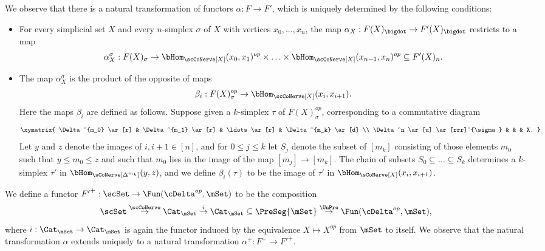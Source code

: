 \begin{notation}
We observe that there is a natural transformation of functors
$\alpha: F \rightarrow F'$, which is uniquely determined by the following conditions:
\begin{itemize}
\item For every simplicial set $X$ and every $n$-simplex $\sigma$ of $X$ with
vertices $x_0, \ldots, x_n$, the map $\alpha_{X}: F(X)_{\bigdot} \rightarrow F'(X)_{\bigdot}$
restricts to a map 
$$\alpha_{X}^{\sigma}: F(X)_{\sigma} \rightarrow \bHom_{ \scCoNerve[X]}(x_0, x_1)^{op}
\times \ldots \times \bHom_{\scCoNerve[X]}( x_{n-1}, x_n)^{op} \subseteq F'(X)_{n}.$$
\item The map $\alpha_{X}^{\sigma}$ is the product of the opposite of maps
$$\beta_{i}: F(X)^{op}_{\sigma} \rightarrow \bHom_{ \scCoNerve[X]}( x_{i}, x_{i+1}).$$ Here the maps $\beta_i$ are defined as follows. Suppose given
a $k$-simplex $\tau$ of $F(X)^{op}_{\sigma}$, corresponding to a commutative diagram
$$ \xymatrix{ \Delta^{m_0} \ar[r] & \Delta^{m_1} \ar[r] & \ldots \ar[r] & \Delta^{m_k} \ar[d] \\
\Delta^n \ar[u] \ar[rrr]^{\sigma} & & & X. }$$
Let $y$ and $z$ denote the images of $i, i+1 \in [n]$, and for $0 \leq j \leq k$ let
$S_{j}$ denote the subset of $[m_k]$ consisting of those elements
$m_0$ such that $y \leq m_0 \leq z$ and such that $m_0$ lies in the image of the map
$[m_j] \rightarrow [m_k]$. The chain of subsets $S_0 \subseteq \ldots \subseteq S_k$
determines a $k$-simplex $\tau'$ in $\bHom_{ \sCoNerve[ \Delta^{m_k}]}(y,z)$, and we define
$\beta_i(\tau)$ to be the image of $\tau'$ in $\bHom_{ \sCoNerve[X]}( x_{i}, x_{i+1})$. 
\end{itemize}

We define a functor ${F'}^{+}: \scSet \rightarrow \Fun( \cDelta^{op}, \mSet)$ to be the composition
$$ \scSet \stackrel{\scCoNerve}{\rightarrow} \Cat_{\mSet}
\stackrel{i}{\rightarrow} \Cat_{\mSet} \subseteq \PreSeg{\mSet} \stackrel{\UnPre}{\rightarrow}
\Fun( \cDelta^{op}, \mSet),$$
where $i: \Cat_{\mSet} \rightarrow \Cat_{\mSet}$ is again the functor induced by the equivalence
$X \mapsto X^{op}$ from $\mSet$ to itself. We observe that the natural transformation $\alpha$
extends uniquely to a natural transformation $\alpha^{+}: F^{+} \rightarrow {F'}^{+}$.
\end{notation}

